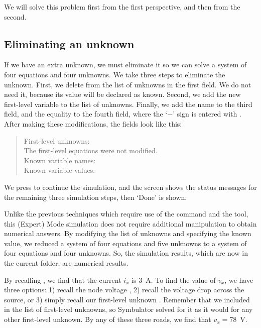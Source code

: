 We will solve this problem first from the first perspective, and
then from the second.

\subsection{Eliminating an unknown}

If we have an extra unknown, we must eliminate it so we can solve a
system of four equations and four unknowns. We take three steps to
eliminate the unknown. First, we delete  from the list of
unknowns in the first field. We do not need it, because its value
will be declared as known. Second, we add the new first-level
variable  to the list of unknowns. Finally, we add the name
 to the third field, and the equality  to
the fourth field, where the `$-$' sign is entered with \key{($-$)}.
After making these modifications, the fields look like this:

\begin{quote}
First-level unknowns: \\
The first-level equations were not modified.\\
Known variable names: \\
Known variable values: 
\end{quote}

We press  to continue the simulation, and the screen
shows the status messages for the remaining three simulation steps,
then `Done' is shown.

Unlike the previous techniques which require use of the 
command and the  tool, this (Expert) Mode simulation
does not require additional manipulation to obtain numerical
answers. By modifying the list of unknowns and specifying the known
value, we reduced a system of four equations and five unknowns to a
system of four equations and four unknowns. So, the simulation
results, which are now in the current folder, are numerical results.

By recalling , we find that the current $i_x$ is 3~A. To
find the value of $v_x$, we have three options: 1) recall the node
voltage , 2) recall the voltage drop  across the
source, or 3) simply recall our first-level unknown .
Remember that we included  in the list of first-level
unknowns, so Symbulator solved for it as it would for any other
first-level unknown. By any of these three roads, we find that
$v_x = 78$~V.

